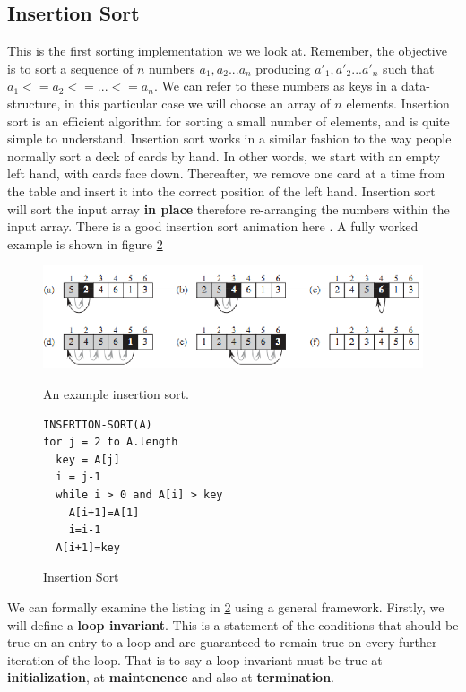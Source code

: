 \documentclass[10pt,a4paper]{article}
\begin{document}
\subsection{Insertion Sort}
This is the first sorting implementation we we look at. Remember, the objective is to sort a sequence of $n$ numbers $a_1,a_2...a_n$ producing $a'_1,a'_2...a'_n$ such that $a_1 <= a_2 <= ... <= a_n$. We can refer to these numbers as keys in a data-structure, in this particular case we will choose an array of $n$ elements. Insertion sort is an efficient algorithm for sorting a small number of elements, and is quite simple to understand. 
\newline\newline
Insertion sort works in a similar fashion to the way people normally sort a deck of cards by hand. In other words, we start with an empty left hand, with cards face down. Thereafter, we remove one card at a time from the table and insert it into the correct position of the left hand. Insertion sort will sort the input array {\bf in place} therefore re-arranging the numbers within the input array. There is a good insertion sort animation here \cite{INSANIM}. A fully worked example is shown in figure \ref{insertionlisting}
\begin{figure}
\caption{An example insertion sort.\cite{INTROALG}}
\begin{center}
\includegraphics[scale=0.43]{../images/insertion.png}
\label{insertion}
\end{center}
\end{figure}
\begin{figure}
\caption{Insertion Sort}
\begin{center}
\begin{lstlisting}
INSERTION-SORT(A)
for j = 2 to A.length
  key = A[j]
  i = j-1
  while i > 0 and A[i] > key
    A[i+1]=A[1]
    i=i-1
  A[i+1]=key
\end{lstlisting}
\label{insertionlisting}
\end{center}
\end{figure}
We can formally examine the listing in \ref{insertionlisting} using a general framework. Firstly, we will define a {\bf loop invariant}. This is a statement of the conditions that should be true on an entry to a loop and are guaranteed to remain true on every further iteration of the loop. That is to say a loop invariant must be true at {\bf initialization}, at {\bf maintenence} and also at {\bf termination}.
\end{document}
